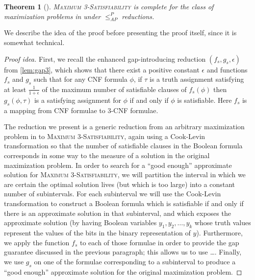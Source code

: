 \documentclass[]{article}
\theoremstyle{plain}
\newtheorem{theorem}{Theorem}
\theoremstyle{definition}
\newenvironment{proofidea}{\begin{proof}[Proof idea]}{\end{proof}}
\newcommand{\APr}{\leq_{AP}^{P}}
\begin{document}
\begin{theorem}[{\cite[Theorem~8.6]{book}}]\label{thm:maxcomplete}
  \textsc{Maximum 3-Satisfiability} is complete for the class of maximization problems in \APX{} under $\APr$ reductions.
\end{theorem}

We describe the idea of the proof before presenting the proof itself, since it is somewhat technical.

\begin{proofidea}
  First, we recall the enhanced gap-introducing reduction $(f_s, g_s, \epsilon)$ from \autoref{lem:gap3}, which shows that there exist a positive constant $\epsilon$ and functions $f_s$ and $g_s$ such that for any CNF formula $\phi$, if $\tau$ is a truth assignment satisfying at least $\frac{1}{1 + \epsilon}$ of the maximum number of satisfiable clauses of $f_s(\phi)$ then $g_s(\phi, \tau)$ is a satisfying assignment for $\phi$ if and only if $\phi$ is satisfiable.
  Here $f_s$ is a mapping from CNF formulae to 3-CNF formulae.

  The reduction we present is a generic reduction from an arbitrary maximization problem in \APX{} to \textsc{Maximum 3-Satisfiability}, again using a Cook-Levin transformation so that the number of satisfiable clauses in the Boolean formula corresponds in some way to the measure of a solution in the original maximization problem.
  In order to search for a ``good enough'' approximate solution for \textsc{Maximum 3-Satisfiability}, we will partition the interval in which we are certain the optimal solution lives (but which is too large) into a constant number of subintervals.
  For each subinterval we will use the Cook-Levin transformation to construct a Boolean formula which is satisfiable if and only if there is an approximate solution in that subinterval, and which exposes the approximate solution (by having Boolean variables $y_1, y_2, \dotsc, y_k$ whose truth values represent the values of the bits in the binary representation of $y$).
  Furthermore, we apply the function $f_s$ to each of those formulae in order to provide the gap guarantee discussed in the previous paragraph; this allows us to use \ldots.
  Finally, we use $g_s$ on one of the formulae corresponding to a subinterval to produce a ``good enough'' approximate solution for the original maximization problem.
\end{proofidea}
\end{document}
